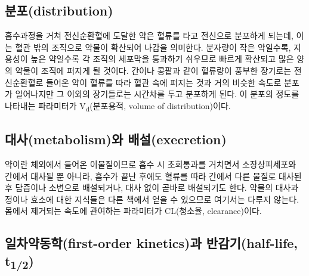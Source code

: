\documentclass[
  11pt,
  krantz2, a4paper, twoside]{krantz}
\theoremstyle{definition}
\theoremstyle{definition}
\theoremstyle{definition}
\theoremstyle{definition}
\theoremstyle{remark}
\begin{document}
\hypertarget{uxbd84uxd3ecdistribution}{%
\subsection{분포(distribution)}\label{uxbd84uxd3ecdistribution}}

흡수과정을 거쳐 전신순환혈에 도달한 약은 혈류를 타고 전신으로 분포하게
되는데, 이는 혈관 밖의 조직으로 약물이 확산되어 나감을 의미한다.
분자량이 작은 약일수록, 지용성이 높은 약일수록 각 조직의 세포막을
통과하기 쉬우므로 빠르게 확산되고 많은 양의 약물이 조직에 퍼지게 될
것이다. 간이나 콩팥과 같이 혈류량이 풍부한 장기로는 전신순환혈로 들어온
약이 혈류를 따라 혈관 속에 퍼지는 것과 거의 비슷한 속도로 분포가
일어나지만 그 이외의 장기들로는 시간차를 두고 분포하게 된다. 이 분포의
정도를 나타내는 파라미터가 V\textsubscript{d}(분포용적, volume of distribution)이다.

\hypertarget{uxb300uxc0acmetabolismuxc640-uxbc30uxc124execretion}{%
\subsection{대사(metabolism)와 배설(execretion)}\label{uxb300uxc0acmetabolismuxc640-uxbc30uxc124execretion}}

약이란 체외에서 들어온 이물질이므로 흡수 시 초회통과를 거치면서
소장상피세포와 간에서 대사될 뿐 아니라, 흡수가 끝난 후에도 혈류를 따라
간에서 다른 물질로 대사된 후 담즙이나 소변으로 배설되거나, 대사 없이
곧바로 배설되기도 한다. 약물의 대사과정이나 효소에 대한 지식들은 다른
책에서 얻을 수 있으므로 여기서는 다루지 않는다. 몸에서 제거되는 속도에
관여하는 파라미터가 CL(청소율, clearance)이다.

\hypertarget{uxc77cuxcc28uxc57duxb3d9uxd559first-order-kineticsuxacfc-uxbc18uxac10uxae30half-life-t12}{%
\subsection{\texorpdfstring{일차약동학(first-order kinetics)과 반감기(half-life, t\textsubscript{1/2})}{일차약동학(first-order kinetics)과 반감기(half-life, t1/2)}}\label{uxc77cuxcc28uxc57duxb3d9uxd559first-order-kineticsuxacfc-uxbc18uxac10uxae30half-life-t12}}

\end{document}
